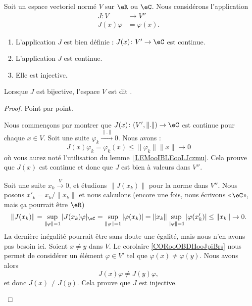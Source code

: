 \begin{propositionDef}      \label{PROPooMAQSooCGFBBM}
Soit un espace vectoriel normé \( V\) sur \( \eR\) ou \( \eC\). Nous considérons l'application
\begin{equation}
    \begin{aligned}
        J\colon V   & \to V''       \\
        J(x)\varphi & = \varphi(x).
    \end{aligned}
\end{equation}
\begin{enumerate}
    \item       \label{ITEMooNVVSooNFXgnE}
          L'application \( J\) est bien définie : \( J(x)\colon V'\to \eC\) est continue.
    \item       \label{ITEMooKURHooZZWpbu}
          L'application \( J\) est continue.
    \item       \label{ITEMooTFYVooKhMOjp}
          Elle est injective.
\end{enumerate}

Lorsque \( J\) est bijective, l'espace \( V\) est dit .
\end{propositionDef}

\begin{proof}
Point par point.
\begin{subproof}
    \spitem[\ref{ITEMooNVVSooNFXgnE}]
    Nous commençons par montrer que \( J(x)\colon (V',\| . \|)\to \eC\) est continue pour chaque \( x\in V\). Soit une suite \( \varphi_k\stackrel{\| . \|}{\longrightarrow}0\). Nous avons :
    \begin{equation}
        J(x)\varphi_k=\varphi_k(x)\leq \| \varphi_k \|\| x \|\to 0
    \end{equation}
    où vous aurez noté l'utilisation du lemme~\ref{LEMooIBLEooLJczmu}.  Cela prouve que \( J(x)\) est continue et donc que \( J\) est bien à valeurs dans \( V''\).
    \spitem[\ref{ITEMooKURHooZZWpbu}]

    Soit une suite \( x_k\stackrel{V}{\longrightarrow}0\), et étudions \( \| J(x_k) \|\) pour la norme dans \( V''\). Nous posons \( x'_k=x_k/\| x_k \|\) et nous calculons (encore une fois, nous écrivons «\( \eC\)», mais ça pourrait être \( \eR\))
    \begin{equation}
        \| J(x_k) \|=\sup_{\| \varphi \|=1}| J(x_k)\varphi |_{\eC}=\sup_{\| \varphi \|=1}| \varphi(x_k) |=\| x_k \|\sup_{\| \varphi \|=1}| \varphi(x'_k) |\leq \| x_k \|\to 0.
    \end{equation}
    La dernière inégalité pourrait être sans doute une égalité, mais nous n'en avons pas besoin ici.
    \spitem[\ref{ITEMooTFYVooKhMOjp}]
    Soient \( x\neq y\) dans \( V\). Le corolaire \ref{CORooOBDHooJpiBrs} nous permet de considérer un élément \( \varphi\in V'\) tel que \( \varphi(x)\neq \varphi(y)\). Nous avons alors
    \begin{equation}
        J(x)\varphi\neq J(y)\varphi,
    \end{equation}
    et donc \( J(x)\neq J(y)\). Cela prouve que \( J\) est injective.
\end{subproof}
\end{proof}

